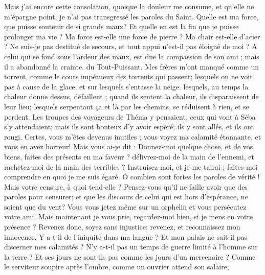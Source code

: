 \begin{multicols}{2}
Mais j’ai encore cette consolation, quoique la douleur me consume, et qu’elle ne m’épargne point, je n'ai pas transgressé les paroles du Saint.
Quelle est ma force, que puisse soutenir de si grands maux? Et quelle en est la fin que je puisse prolonger ma vie ? 
Ma force est-elle une force de pierre ? Ma chair est-elle d'acier ?
Ne suis-je pas destitué de secours, et tout appui n'est-il pas éloigné de moi ?
A celui qui se fond sous l'ardeur des maux, est due la compassion de son ami ; mais il a abandonné la crainte.  du Tout-Puissant.
Mes frères m'ont manqué comme un torrent, comme le cours impétueux des torrents qui passent;
lesquels on ne voit pas à cause de la glace, et sur lesquels s'entasse la neige.
lesquels, au temps la chaleur donne dessus, défaillent ; quand ils sentent la chaleur, ils disparaissent de leur lieu;
lesquels serpentant ça et là par les chemins, se réduisent à rien, et se perdent.
Les troupes des voyageurs de Théma y pensaient, ceux qui vont à Séba s'y attendaient;
mais ils sont honteux d'y avoir espéré; ils y sont allés, et ils ont rougi.
Certes, vous m'êtes devenus inutiles ; vous voyez ma calamité étonnante, et vous en avez horreur!
Mais vous ai-je dit : Donnez-moi quelque chose, et de vos biens, faites des présents en ma faveur ?
délivrez-moi de la main de l'ennemi, et rachetez-moi de la main des terribles ?
Instruisez-moi, et je me tairai ; faites-moi comprendre en quoi je me suis égaré.
Ô combien sont fortes les paroles de vérité ! Mais votre censure, à quoi tend-elle ?
Pensez-vous qu'il ne faille avoir que des paroles pour censurer; et que les discours de celui qui est hors d'espérance, ne soient que du vent?
Vous vous jetez même sur un orphelin et vous persécutez votre ami.
Mais maintenant je vous prie, regardez-moi bien, si je mens en votre présence ?
Revenez donc, soyez sans injustice; revenez, et reconnaissez mon innocence.
Y a-t-il de l'iniquité dans ma langue ? Et mon palais ne sait-il pas discerner mes calamités ? 
\VerseOne{}N'y a-t-il pas un temps de guerre limité à l'homme sur la terre ? Et ses jours ne sont-ils pas comme les jours d'un mercenaire ?
Comme le serviteur soupire après l'ombre, comme un ouvrier attend son salaire, 

\end{multicols}
